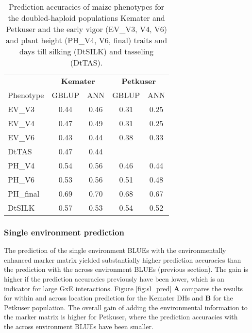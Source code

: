\onehalfspacing
\begin{table}[H]
  \caption[Prediction accuracies of maize phenotypes for GBLUP and ANN]{Prediction
    accuracies of maize phenotypes for the doubled-haploid populations Kemater and
    Petkuser and the early vigor (EV\_V3, V4, V6) and plant height (PH\_V4, V6, final) traits and
    days till silking (DtSILK) and tasseling (DtTAS).}
  \centering
  \begin{tabular}{lcc|cc}
    \toprule
    & \multicolumn{2}{c}{\textbf{Kemater}} & \multicolumn{2}{c}{\textbf{Petkuser}} \\
    Phenotype & GBLUP                                & ANN  & GBLUP & ANN                    \\ 
    \midrule
    EV\_V3    & 0.44                                 & 0.46 & 0.31  & 0.25                   \\ 
    EV\_V4    & 0.47                                 & 0.49 & 0.31  & 0.25                   \\ 
    EV\_V6    & 0.43                                 & 0.44 & 0.38  & 0.33                   \\ 
    DtTAS     & 0.47                                 & 0.44 &       &                        \\ 
    PH\_V4    & 0.54                                 & 0.56 & 0.46  & 0.44                   \\ 
    PH\_V6    & 0.53                                 & 0.56 & 0.51  & 0.48                   \\ 
    PH\_final & 0.69                                 & 0.70 & 0.68  & 0.67                   \\ 
    DtSILK    & 0.57                                 & 0.53 & 0.54  & 0.52                   \\ 
    \bottomrule
\end{tabular}
  \label{tab:maizepred}
\end{table}
\doublespacing

\subsubsection{Single environment prediction}

The prediction of the single environment BLUEs with the environmentally enhanced marker
matrix yielded substantially higher prediction accuracies than the prediction with the
across environment BLUEs (previous section). The gain is higher if the prediction
accuracies previously have been lower, which is an indicator for large GxE
interactions. Figure \ref{fig:sl_pred} \textbf{A} compares the results for within and
across location prediction for the Kemater DHs and \textbf{B} for the Petkuser
population. The overall gain of adding the environmental information to the marker matrix
is higher for Petkuser, where the prediction accuracies with the across environment BLUEs
have been smaller.

